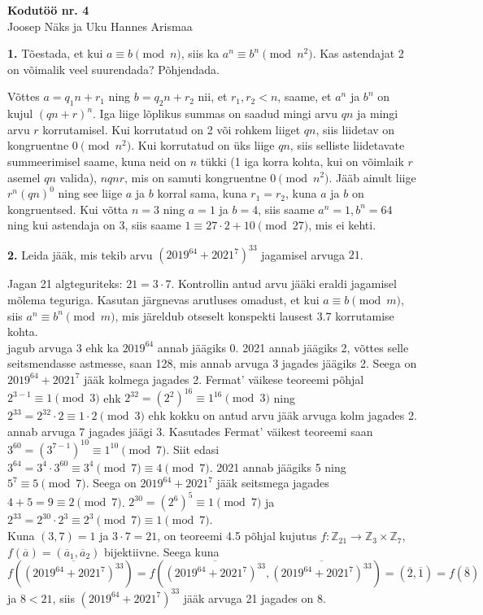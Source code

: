 \documentclass[a4paper, 10pt]{article}
\newcommand{\Z}{\mathbb{Z}}
\begin{document}
\begin{center}
\Large\textbf{Kodutöö nr. 4}\\
\small{Joosep Näks ja Uku Hannes Arismaa}
\end{center}

\bigskip
\bigskip

\noindent \textbf{1.} Tõestada, et kui $a\equiv b\pmod{n}$, siis ka $a^n\equiv b^n\pmod{n^2}$. Kas astendajat 2 on võimalik veel suurendada? Põhjendada. 

\bigskip
Võttes $a=q_1n+r_1$ ning $b=q_2n+r_2$ nii, et $r_1,r_2<n$, saame, et $a^n$ ja $b^n$ on kujul $(qn+r)^n$. Iga liige lõplikus summas on saadud mingi arvu $qn$ ja mingi arvu $r$ korrutamisel. Kui korrutatud on 2 või rohkem liiget $qn$, siis liidetav on kongruentne $0\pmod{n^2}$. Kui korrutatud on üks liige $qn$, siis selliste liidetavate summeerimisel saame, kuna neid on $n$ tükki (1 iga korra kohta, kui on võimlaik $r$ asemel $qn$ valida), $nqnr$, mis on samuti kongruentne $0\pmod{n^2}$. Jääb ainult liige $r^n(qn)^0$ ning see liige  $a$ ja $b$ korral sama, kuna $r_1=r_2$, kuna $a$ ja $b$ on kongruentsed. Kui võtta $n=3$ ning $a=1$ ja $b=4$, siis saame $a^n=1,b^n=64$ ning kui astendaja on 3, siis saame $1\equiv 27\cdot 2+10 \pmod{27}$, mis ei kehti.
\bigskip

\noindent \textbf{2.} Leida j\"a\"ak, mis tekib arvu $(2019^{64}+2021^{7})^{33}$ jagamisel arvuga $21$.

\bigskip

Jagan 21 algteguriteks: $21=3\cdot7$. Kontrollin antud arvu jääki eraldi jagamisel mõlema teguriga. Kasutan järgnevas arutluses omadust, et kui $a\equiv b\pmod m$, siis $a^n\equiv b^n\pmod m$, mis järeldub otseselt konspekti lausest 3.7 korrutamise kohta.\\
 jagub arvuga 3 ehk ka $2019^{64}$ annab jäägiks 0. 2021 annab jäägiks 2, võttes selle seitsmendasse astmesse, saan 128, mis annab arvuga 3 jagades jäägiks 2. Seega on $2019^{64}+2021^7$ jääk kolmega jagades 2. Fermat' väikese teoreemi põhjal $2^{3-1}\equiv1\pmod 3$ ehk $2^{32}=(2^2)^{16}\equiv1^{16}\pmod 3$ ning $2^{33}=2^{32}\cdot2\equiv1\cdot2\pmod 3$ ehk kokku on antud arvu jääk arvuga kolm jagades 2.\\
 annab arvuga 7 jagades jäägi 3. Kasutades Fermat' väikest teoreemi saan $3^{60}=(3^{7-1})^{10}\equiv1^{10}\pmod 7$. Siit edasi $3^{64} = 3^4\cdot3^{60}\equiv3^4\pmod 7\equiv4\pmod7$. 2021 annab jäägiks 5 ning $5^7\equiv5\pmod7$. Seega on $2019^{64}+2021^7$ jääk seitsmega jagades $4+5=9\equiv2\pmod7$. $2^{30}=(2^6)^5\equiv1\pmod7$ ja $2^{33}=2^{30}\cdot2^3\equiv2^3\pmod7\equiv1\pmod7$.\\
Kuna $(3,7)=1$ ja $3\cdot7=21$, on teoreemi 4.5 põhjal kujutus $f:\Z_{21}\rightarrow\Z_3\times\Z_7$, $f(\overline a)=(\overline a_1,\overline a_2)$ bijektiivne. Seega kuna $f(\overline{(2019^{64}+2021^{7})^{33}})=f(\overline{(2019^{64}+2021^{7})^{33}},\overline{(2019^{64}+2021^{7})^{33}})=(\overline2,\overline1)=f(\overline8)$ ja $8<21$, siis $(2019^{64}+2021^{7})^{33}$ jääk arvuga 21 jagades on 8.
\end{document}
